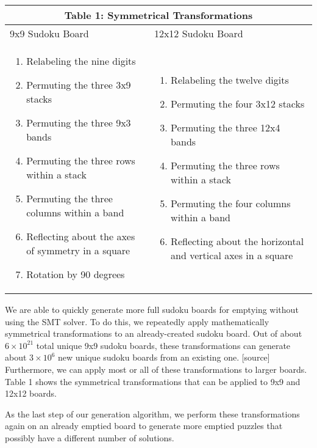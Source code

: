 \singlespace
\begin{table}
\begin{tabularx}{\textwidth}{|X|X|}
\hline
\multicolumn{2}{|c|}{Table 1: Symmetrical Transformations}\\
\hline
9x9 Sudoku Board & 12x12 Sudoku Board
\\
\hline
\begin{enumerate}
\item Relabeling the nine digits
\item Permuting the three 3x9 stacks
\item Permuting the three 9x3 bands
\item Permuting the three rows within a stack
\item Permuting the three columns within a band
\item Reflecting about the axes of symmetry in a square
\item Rotation by 90 degrees
\end{enumerate} &

\begin{enumerate}
\item Relabeling the twelve digits
\item Permuting the four 3x12 stacks
\item Permuting the three 12x4 bands
\item Permuting the three rows within a stack
\item Permuting the four columns within a band
\item Reflecting about the horizontal and vertical axes in a square
\end{enumerate}
 \\
\hline
\end{tabularx}
\end{table}

\doublespace

We are able to quickly generate more full sudoku boards for emptying
without using the SMT solver. To do this, we repeatedly apply
mathematically symmetrical transformations to an already-created
sudoku board. Out of about $6 \times 10^{21}$ total unique 9x9 sudoku
boards, these transformations can generate about $3\times 10^6$ new
unique sudoku boards from an existing one. [source] Furthermore, we
can apply most or all of these transformations to larger boards. Table
1 shows the symmetrical transformations that can be applied to 9x9 and
12x12 boards.

As the last step of our generation algorithm, we perform these transformations again on an already emptied board to generate more emptied puzzles that possibly have a different number of solutions.


